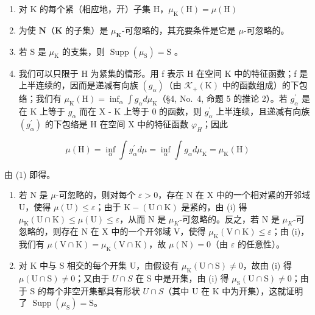 \begin{enumerate}
\def\labelenumi{(\roman{enumi})}
\item
  对 K 的每个紧（相应地，开）子集 H，\(\mu_{\mathrm{K}}(\mathrm{H}) = \mu (\mathrm{H})\)
\item
  为使 \(\mathbf{N}\)（\(\mathbf{K}\) 的子集）是 \(\mu_{\mathbf{K}}\)-可忽略的，其充要条件是它是 \(\mu\)-可忽略的。
\item
  若 S 是 \(\mu_{\mathrm{K}}\) 的支集，则 \(\operatorname{Supp}(\mu_{\mathrm{S}}) = \mathrm{S}\) 。
\setcounter{enumi}{0}
\item
  我们可以只限于 H 为紧集的情形。用 f 表示 H 在空间 K 中的特征函数；f 是上半连续的，因而是递减有向族 \((g_{\alpha})\)（由 \(\mathcal{K}_{+}(\mathrm{K})\) 中的函数组成）的下包络；我们有 \(\mu_{\mathrm{K}}(\mathrm{H}) = \inf_{\alpha} \int g_{\alpha} d\mu_{\mathrm{K}}\)（§4, No.~4, 命题 5 的推论 2）。若 \(g_{\alpha}^{\prime}\) 是在 K 上等于 \(g_{\alpha}\) 而在 X - K 上等于 0 的函数，则 \(g_{\alpha}^{\prime}\) 上半连续，且递减有向族 \((g_{\alpha}^{\prime})\) 的下包络是 H 在空间 X 中的特征函数 \(\varphi_{H}\)；因此
\end{enumerate}

\[
\mu (\mathrm{H}) = \inf _ {\alpha} \int g _ {\alpha} ^ {\prime} d \mu = \inf _ {\alpha} \int g _ {\alpha} d \mu_ {\mathrm{K}} = \mu_ {\mathrm{K}} (\mathrm{H})
\]

由 (1) 即得。

\begin{enumerate}
\def\labelenumi{(\roman{enumi})}
\setcounter{enumi}{1}
\item
  若 N 是 \(\mu\)-可忽略的，则对每个 \(\varepsilon > 0\)，存在 N 在 X 中的一个相对紧的开邻域 U，使得 \(\mu(\mathrm{U}) \leqslant \varepsilon\)；由于 \(\mathrm{K} - (\mathrm{U} \cap \mathrm{K})\) 是紧的，由 (i) 得 \(\mu_{\mathrm{K}}(\mathrm{U} \cap \mathrm{K}) \leqslant \mu(\mathrm{U}) \leqslant \varepsilon\)，从而 N 是 \(\mu_{K}\)-可忽略的。反之，若 N 是 \(\mu_{K}\)-可忽略的，则存在 N 在 X 中的一个开邻域 V，使得 \(\mu_{\mathrm{K}}(\mathrm{V} \cap \mathrm{K}) \leqslant \varepsilon\)；由 (i)，我们有 \(\mu(\mathrm{V} \cap \mathrm{K}) = \mu_{\mathrm{K}}(\mathrm{V} \cap \mathrm{K})\)，故 \(\mu(\mathrm{N}) = 0\)（由 \(\varepsilon\) 的任意性）。
\item
  对 K 中与 S 相交的每个开集 U，由假设有 \(\mu_{\mathrm{K}}(\mathrm{U}\cap\mathrm{S})\neq0\)，故由 (i) 得 \(\mu(\mathrm{U}\cap\mathrm{S})\neq0\)；又由于 \(U\cap S\) 在 S 中是开集，由 (i) 得 \(\mu_{\mathrm{S}}(\mathrm{U}\cap\mathrm{S})\neq0\)；由于 S 的每个非空开集都具有形状 \(U\cap S\)（其中 U 在 K 中为开集），这就证明了 \(\operatorname{Supp}(\mu_{\mathrm{S}})=\mathrm{S}\)。
\end{enumerate}

